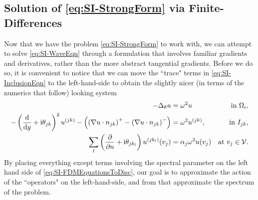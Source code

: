 \subsection{Solution of \eqref{eq:SI-StrongForm} via Finite-Differences} \label{ssec:SI-FDMMethod}
Now that we have the problem \eqref{eq:SI-StrongForm} to work with, we can attempt to solve \eqref{eq:SI-WaveEqn} through a formulation that involves familiar gradients and derivatives, rather than the more abstract tangential gradients.
Before we do so, it is convenient to notice that we can move the ``trace" terms in \eqref{eq:SI-InclusionEqn} to the left-hand-side to obtain the slightly nicer (in terms of the numerics that follow) looking system
\begin{subequations} \label{eq:SI-FDMEquationsToDisc}
	\begin{align}
		-\Delta_\theta u 
		&= \omega^2 u 
		&\text{in } \Omega_i, \label{eq:SI-FDMBulk} \\
		- \left( \dfrac{\mathrm{d}}{\mathrm{d}y} + \mathrm{i}\theta_{jk} \right)^2u^{(jk)}  - \left( \left( \nabla u\cdot n_{jk} \right)^+ - \left( \nabla u\cdot n_{jk} \right)^- \right)
		&= \omega^2 u^{(jk)},
		&\text{in } I_{jk}, \label{eq:SI-FDMSkeleton} \\
		\sum_l \left( \dfrac{\partial }{\partial n}+\mathrm{i}\theta_{jk_l} \right) u^{(jk_l)}(v_j) 
		&= \alpha_j\omega^2 u(v_j)
		&\text{at } v_j\in\mathcal{V}. \label{eq:SI-FDMVertex}
	\end{align}
\end{subequations}
By placing everything except terms involving the spectral parameter on the left hand side of \eqref{eq:SI-FDMEquationsToDisc}, our goal is to approximate the action of the ``operators" on the left-hand-side, and from that approximate the spectrum of the problem.

